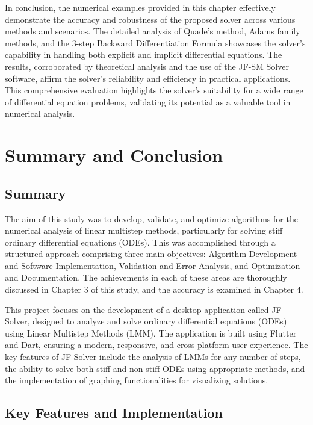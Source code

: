\documentclass[a4paper, twoside]{report} %
\begin{document}
	\newpage
	In conclusion, the numerical examples provided in this chapter effectively demonstrate the accuracy and robustness of the proposed solver across various methods and scenarios. The detailed analysis of Quade's method, Adams family methods, and the 3-step Backward Differentiation Formula showcases the solver's capability in handling both explicit and implicit differential equations. The results, corroborated by theoretical analysis and the use of the JF-SM Solver software, affirm the solver's reliability and efficiency in practical applications. This comprehensive evaluation highlights the solver's suitability for a wide range of differential equation problems, validating its potential as a valuable tool in numerical analysis.



	\chapter{Summary and Conclusion}

	\section{Summary}
	The aim of this study was to develop, validate, and optimize algorithms for the numerical analysis of linear multistep methods, particularly for solving stiff ordinary differential equations (ODEs). This was accomplished through a structured approach comprising three main objectives: Algorithm Development and Software Implementation, Validation and Error Analysis, and Optimization and Documentation. The achievements in each of these areas are thoroughly discussed in Chapter 3 of this study, and the accuracy is examined in Chapter 4.

	This project focuses on the development of a desktop application called JF-Solver, designed to analyze and solve ordinary differential equations (ODEs) using Linear Multistep Methods (LMM). The application is built using Flutter and Dart, ensuring a modern, responsive, and cross-platform user experience. The key features of JF-Solver include the analysis of LMMs for any number of steps, the ability to solve both stiff and non-stiff ODEs using appropriate methods, and the implementation of graphing functionalities for visualizing solutions.

	\section{Key Features and Implementation}
\end{document}
